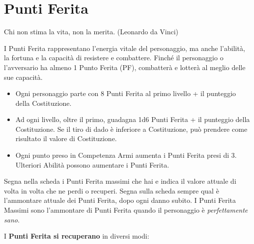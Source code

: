 \section{Punti Ferita}\label{puntiferita}

\begin{enfasi}{Chi non stima la vita, non la merita. (Leonardo da Vinci)}\end{enfasi}

\medskip

I Punti Ferita rappresentano l'energia vitale del personaggio, ma anche l'abilità, la fortuna e la capacità di resistere e combattere. Finché il personaggio o l'avversario ha almeno 1 Punto Ferita (PF), combatterà e lotterà al meglio delle sue capacità.

\begin{itemize}[leftmargin=*] \setlength{\itemsep}{0pt}
\item Ogni personaggio parte con 8 Punti Ferita al primo livello + il punteggio della Costituzione.

\item Ad ogni livello, oltre il primo, guadagna 1d6 Punti Ferita + il punteggio della Costituzione. Se il tiro di dado è inferiore a Costituzione, può prendere come risultato il valore di Costituzione.

\item Ogni punto preso in Competenza Armi aumenta i Punti Ferita presi di 3. Ulteriori Abilità possono aumentare i Punti Ferita.
\end{itemize}

Segna nella scheda i Punti Ferita massimi che hai e indica il valore attuale di volta in volta che ne perdi o recuperi. Segna sulla scheda sempre qual è l'ammontare attuale dei Punti Ferita, dopo ogni danno subito. I Punti Ferita Massimi sono l'ammontare di Punti Ferita quando il personaggio è \emph{perfettamente sano}.


\medskip

I \textbf{Punti Ferita si recuperano} in diversi modi:\label{recuperarepf}


